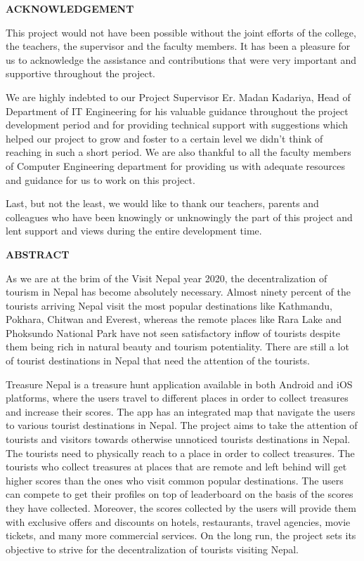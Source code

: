 \documentclass[12pt, a4paper, oneside]{article}
\begin{document}
\large
\begin{center}
	\textbf{ACKNOWLEDGEMENT}
\end{center}

\normalsize

This project would not have been possible without the joint efforts of the college, the teachers, the supervisor and the faculty members. It has been a pleasure for us to acknowledge the assistance and contributions that were very important and supportive throughout the project.

We are highly indebted to our Project Supervisor Er. Madan Kadariya, Head of Department of IT Engineering for his valuable guidance throughout the project development period and for providing technical support with suggestions which helped our project to grow and foster to a certain level we didn’t think of reaching in such a short period. We are also thankful to all the faculty members of Computer Engineering department for providing us with adequate resources and guidance for us to work on this project.

Last, but not the least, we would like to thank our teachers, parents and colleagues who have been knowingly or unknowingly the part of this project and lent support and views during the entire development time.

\break





\large
\begin{center}
	\textbf{ABSTRACT}
\end{center}
\normalsize
As we are at the brim of the Visit Nepal year 2020, the decentralization of tourism in Nepal has become absolutely necessary. Almost ninety percent of the tourists arriving Nepal visit the most popular destinations like Kathmandu, Pokhara, Chitwan and Everest, whereas the remote places like Rara Lake and Phoksundo National Park have not seen satisfactory inflow of tourists despite them being rich in natural beauty and tourism potentiality. There are still a lot of tourist destinations in Nepal that need the attention of the tourists.

Treasure Nepal is a treasure hunt application available in both Android and iOS platforms, where the users travel to different places in order to collect treasures and increase their scores. The app has an integrated map that navigate the users to various tourist destinations in Nepal. The project aims to take the attention of tourists and visitors towards otherwise unnoticed tourists destinations in Nepal. The tourists need to physically reach to a place in order to collect treasures. The tourists who collect treasures at places that are remote and left behind will get higher scores than the ones who visit common popular destinations. The users can compete to get their profiles on top of leaderboard on the basis of the scores they have collected. Moreover, the scores collected by the users will provide them with exclusive offers and discounts on hotels, restaurants, travel agencies, movie tickets, and many more commercial services. On the long run, the project sets its objective to strive for the decentralization of tourists visiting Nepal.
\end{document}
